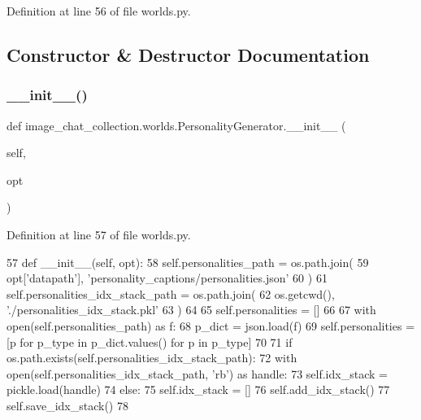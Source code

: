 Definition at line 56 of file worlds.\+py.



\subsection{Constructor \& Destructor Documentation}
\mbox{\label{classimage__chat__collection_1_1worlds_1_1PersonalityGenerator_aea4fe82298d9fea4e7b20b3380a47c99}} 
\subsubsection{\texorpdfstring{\+\_\+\+\_\+init\+\_\+\+\_\+()}{\_\_init\_\_()}}
{\footnotesize\ttfamily def image\+\_\+chat\+\_\+collection.\+worlds.\+Personality\+Generator.\+\_\+\+\_\+init\+\_\+\+\_\+ (\begin{DoxyParamCaption}\item[{}]{self,  }\item[{}]{opt }\end{DoxyParamCaption})}



Definition at line 57 of file worlds.\+py.


\begin{DoxyCode}
57     \textcolor{keyword}{def }\_\_init\_\_(self, opt):
58         self.personalities\_path = os.path.join(
59             opt[\textcolor{stringliteral}{'datapath'}], \textcolor{stringliteral}{'personality\_captions/personalities.json'}
60         )
61         self.personalities\_idx\_stack\_path = os.path.join(
62             os.getcwd(), \textcolor{stringliteral}{'./personalities\_idx\_stack.pkl'}
63         )
64 
65         self.personalities = []
66 
67         with open(self.personalities\_path) \textcolor{keyword}{as} f:
68             p\_dict = json.load(f)
69             self.personalities = [p \textcolor{keywordflow}{for} p\_type \textcolor{keywordflow}{in} p\_dict.values() \textcolor{keywordflow}{for} p \textcolor{keywordflow}{in} p\_type]
70 
71         \textcolor{keywordflow}{if} os.path.exists(self.personalities\_idx\_stack\_path):
72             with open(self.personalities\_idx\_stack\_path, \textcolor{stringliteral}{'rb'}) \textcolor{keyword}{as} handle:
73                 self.idx\_stack = pickle.load(handle)
74         \textcolor{keywordflow}{else}:
75             self.idx\_stack = []
76             self.add\_idx\_stack()
77             self.save\_idx\_stack()
78 
\end{DoxyCode}



